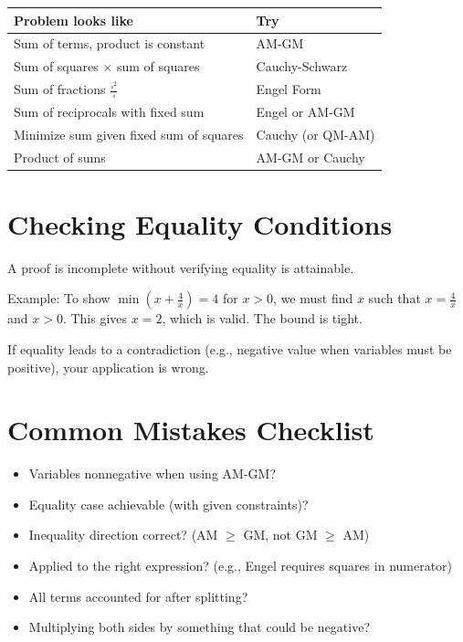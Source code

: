 \documentclass{article}
\begin{document}
\begin{center}
\begin{tabular}{|l|l|}
\hline
\textbf{Problem looks like} & \textbf{Try} \\
\hline
Sum of terms, product is constant & AM-GM \\
\hline
Sum of squares $\times$ sum of squares & Cauchy-Schwarz \\
\hline
Sum of fractions $\frac{\square^2}{\square}$ & Engel Form \\
\hline
Sum of reciprocals with fixed sum & Engel or AM-GM \\
\hline
Minimize sum given fixed sum of squares & Cauchy (or QM-AM) \\
\hline
Product of sums & AM-GM or Cauchy \\
\hline
\end{tabular}
\end{center}

\section{Checking Equality Conditions}

A proof is incomplete without verifying equality is attainable.

Example: To show $\min\!\left(x + \frac{4}{x}\right) = 4$ for $x > 0$, we must find $x$ such that $x = \frac{4}{x}$ and $x > 0$. This gives $x = 2$, which is valid. The bound is tight.

If equality leads to a contradiction (e.g., negative value when variables must be positive), your application is wrong.

\section{Common Mistakes Checklist}

\begin{itemize}
  \item[\ ] Variables nonnegative when using AM-GM?
  \item[\ ] Equality case achievable (with given constraints)?
  \item[\ ] Inequality direction correct? (AM $\geq$ GM, not GM $\geq$ AM)
  \item[\ ] Applied to the right expression? (e.g., Engel requires squares in numerator)
  \item[\ ] All terms accounted for after splitting?
  \item[\ ] Multiplying both sides by something that could be negative?
\end{itemize}
\end{document}
